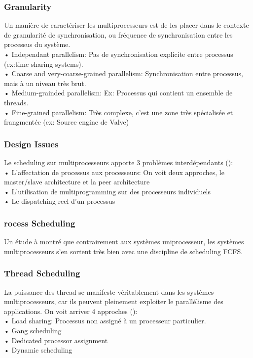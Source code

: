 \subsubsection{Granularity}
Un manière de caractériser les multiprocesseurs est de les placer dans le contexte de granularité de synchronisation, ou fréquence de synchronisation entre les processus du système.
\\
• Independant parallelism: Pas de synchronisation explicite entre processus (ex:time sharing systems).
\\
• Coarse and very-coarse-grained parallelism: Synchronisation entre processus, mais à un niveau très brut.
\\
• Medium-grainded parallelism: Ex: Processus qui contient un ensemble de threads.\\
• Fine-grained parallelism: Très complexe, c'est une zone très spécialisée et frangmentée (ex: Source engine de Valve)
\subsubsection{Design Issues}
Le scheduling sur multiprocesseurs apporte 3 problèmes interdépendants (\cite[p.~434-435]{stallings}):\\
• L'affectation de processus aux processeurs: On voit deux approches, le master/slave architecture et la peer architecture\\
• L'utilisation de multiprogramming sur des processeurs individuels\\
• Le dispatching reel d'un processus
\subsubsection{rocess Scheduling}
Un étude à montré que contrairement aux systèmes uniprocesseur, les systèmes multiprocesseurs s'en sortent très bien avec une discipline de scheduling FCFS.
\subsubsection{Thread Scheduling}
La puissance des thread se manifeste véritablement dans les systèmes multiprocesseurs, car ils peuvent pleinement exploiter le parallélisme des applications.
On voit arriver 4 approches (\cite[p.~437-442]{stallings}):\\
• Load sharing: Processus non assigné à un processeur particulier.
\\
• Gang scheduling\\
• Dedicated processor assignment\\
• Dynamic scheduling
